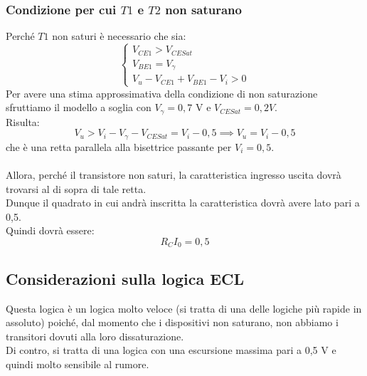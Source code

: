 \documentclass[../main.tex]{subfiles}
\begin{document}
	\subsubsection{Condizione per cui $T1$ e $T2$ non saturano}
	Perché $T1$ non saturi è necessario che sia:
	\[ \left\{ \begin{array}{l} V_{CE1} > V_{CESat} \\ V_{BE1} = V_\gamma \\ V_u - V_{CE1} + V_{BE1} - V_i > 0 \end{array} \right. \]
	Per avere una stima approssimativa della condizione di non saturazione sfruttiamo il modello a soglia con $V_\gamma = 0,7$ V e $V_{CESat} = 0,2 V$.\\
	Risulta:
	\[ V_u > V_i - V_\gamma - V_{CESat} = V_i - 0,5 \implies V_u = V_i - 0,5 \]
	che è una retta parallela alla bisettrice passante per $V_i = 0,5$.\\\\
	Allora, perché il transistore non saturi, la caratteristica ingresso uscita dovrà trovarsi al di sopra di tale retta.\\
	Dunque il quadrato in cui andrà inscritta la caratteristica dovrà avere lato pari a 0,5.\\
	Quindi dovrà essere:
	\[ R_C I_0 = 0,5 \]
	\subsection{Considerazioni sulla logica ECL}
	Questa logica è un logica molto veloce (si tratta di una delle logiche più rapide in assoluto) poiché, dal momento che i dispositivi non saturano, non abbiamo i transitori dovuti alla loro dissaturazione.\\
	Di contro, si tratta di una logica con una escursione massima pari a 0,5 V e quindi molto sensibile al rumore.
\end{document}
